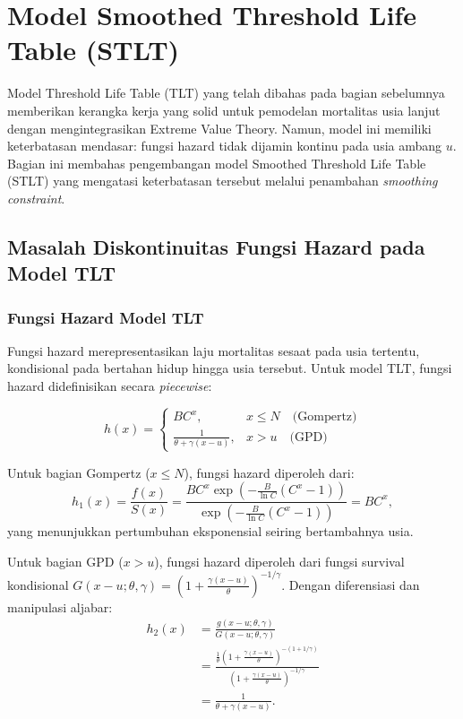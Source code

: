 \section{Model Smoothed Threshold Life Table (STLT)}

Model Threshold Life Table (TLT) yang telah dibahas pada bagian sebelumnya memberikan kerangka kerja yang solid untuk pemodelan mortalitas usia lanjut dengan mengintegrasikan Extreme Value Theory. Namun, model ini memiliki keterbatasan mendasar: fungsi hazard tidak dijamin kontinu pada usia ambang $u$. Bagian ini membahas pengembangan model Smoothed Threshold Life Table (STLT) yang mengatasi keterbatasan tersebut melalui penambahan \textit{smoothing constraint}.

\subsection{Masalah Diskontinuitas Fungsi Hazard pada Model TLT}

\subsubsection{Fungsi Hazard Model TLT}

Fungsi hazard merepresentasikan laju mortalitas sesaat pada usia tertentu, kondisional pada bertahan hidup hingga usia tersebut. Untuk model TLT, fungsi hazard didefinisikan secara \textit{piecewise}:

\begin{equation}
h(x) = 
\begin{cases}
BC^x, & x \leq N \quad \text{(Gompertz)} \\[8pt]
\displaystyle\frac{1}{\theta + \gamma(x-u)}, & x > u \quad \text{(GPD)}
\end{cases}
\label{eq:tlt_hazard_piecewise}
\end{equation}

Untuk bagian Gompertz ($x \leq N$), fungsi hazard diperoleh dari:
\begin{equation}
h_1(x) = \frac{f(x)}{S(x)} = \frac{BC^x \exp\left(-\frac{B}{\ln C}(C^x - 1)\right)}{\exp\left(-\frac{B}{\ln C}(C^x - 1)\right)} = BC^x,
\label{eq:hazard_gompertz_derivation}
\end{equation}
yang menunjukkan pertumbuhan eksponensial seiring bertambahnya usia.

Untuk bagian GPD ($x > u$), fungsi hazard diperoleh dari fungsi survival kondisional $G(x-u; \theta, \gamma) = \left(1 + \frac{\gamma(x-u)}{\theta}\right)^{-1/\gamma}$. Dengan diferensiasi dan manipulasi aljabar:
\begin{align}
h_2(x) &= \frac{g(x-u; \theta, \gamma)}{G(x-u; \theta, \gamma)} \nonumber \\
&= \frac{\frac{1}{\theta}\left(1 + \frac{\gamma(x-u)}{\theta}\right)^{-(1+1/\gamma)}}{\left(1 + \frac{\gamma(x-u)}{\theta}\right)^{-1/\gamma}} \nonumber \\
&= \frac{1}{\theta + \gamma(x-u)}.
\label{eq:hazard_gpd_derivation}
\end{align}


